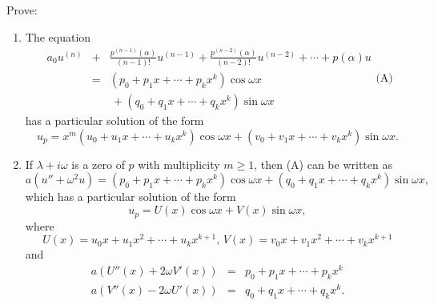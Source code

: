 \documentclass{ximera}
\begin{document}
\begin{problem}\label{exer:9.3.76}
Prove:
\begin{enumerate}
\item %
The equation
$$
\begin{array}{lcl}
a_0u^{(n)}&+&\frac{p^{(n-1)}(\alpha)}{(n-1)!}u^{(n-1)}+
\frac{p^{(n-2)}(\alpha)}{(n-2)!}u^{(n-2)}+\cdots+p(\alpha)u\\
&=&\left(p_0+p_1x+\cdots+p_kx^k\right)\cos
\omega x\\&&\,+ \left(q_0+q_1x+\cdots+q_kx^k\right)\sin\omega x
\end{array}
\text{(A)}
$$
has a particular solution of the form
$$
u_p=x^m\left(u_0+u_1x+\cdots+u_kx^k\right)\cos\omega x+
\left(v_0+v_1x+\cdots+v_kx^k\right)\sin\omega x.
$$
\item %
If $\lambda+i\omega$ is a zero of $p$ with multiplicity $m\ge1$, then
(A) can be written as
$$
a(u''+\omega^2 u)=
\left(p_0+p_1x+\cdots+p_kx^k\right)\cos\omega x+
\left(q_0+q_1x+\cdots+q_kx^k\right)\sin\omega x,
$$
which has a particular solution of the form
$$
u_p=U(x)\cos\omega x+V(x)\sin\omega x,
$$
where
$$
U(x)=u_0x+u_1x^2+\cdots+u_kx^{k+1},\,V(x)=v_0x+v_1x^2+\cdots+v_kx^{k+1}
$$
and
$$
\begin{array}{rcl}
a(U''(x)+2\omega V'(x))&=&p_0+p_1x+\cdots+p_kx^k\\
a(V''(x)-2\omega U'(x))&=&q_0+q_1x+\cdots+q_kx^k.
\end{array}
$$
\end{enumerate}
\end{problem}
\end{document}
